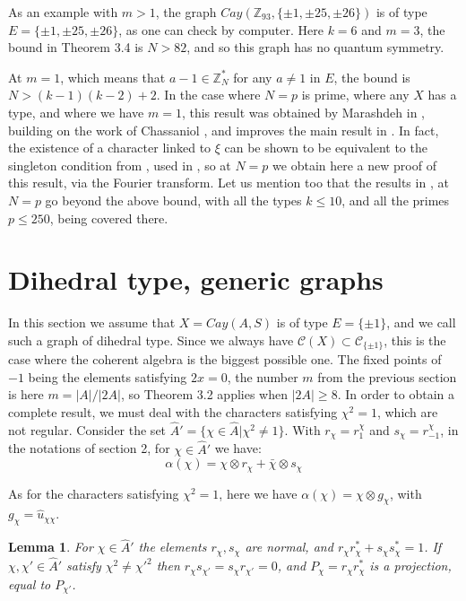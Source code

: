 \documentclass[11pt]{amsart}
\newtheorem{lemma}[theorem]{Lemma}
\newcommand{\C}{\mathcal C}
\newcommand{\Z}{\mathbb Z}
\newcommand{\hA}{\widehat A}
\newcommand{\hu}{\widehat u}
\newcommand{\bchi}{\bar\chi}
\begin{document}
As an example with $m>1$, the graph $Cay(\Z_{93},\{\pm1,\pm25,\pm26\})$ is of type $E=\{\pm1,\pm25,\pm26\}$, as one can check by computer. Here $k=6$ and $m=3$, the bound in Theorem 3.4 is $N>82$, and so this graph has no quantum symmetry.

At $m=1$, which means that $a-1\in\Z_N^*$ for any $a\neq1$ in $E$, the bound is $N>(k-1)(k-2)+2$. In the case where $N=p$ is prime, where any $X$ has a type, and where we have $m=1$, this result was obtained by Marashdeh in \cite{mar}, building on the work of Chassaniol \cite{cha}, and improves the main result in \cite{bbc}. In fact, the existence of a character linked to $\xi$ can be shown to be equivalent to the singleton condition from \cite{cha}, used in \cite{mar}, so at $N=p$ we obtain here a new proof of this result, via the Fourier transform. Let us mention too that the results in \cite{cha}, \cite{mar} at $N=p$ go beyond the above bound, with all the types $k\leq10$, and all the primes $p\leq250$, being covered there.

\section{Dihedral type, generic graphs}

In this section we assume that $X=Cay(A,S)$ is of type $E=\{\pm1\}$, and we call such a graph of dihedral type. Since we always have $\C(X)\subset\C_{\{\pm1\}}$, this is the case where the coherent algebra is the biggest possible one. The fixed points of $-1$ being the elements satisfying $2x=0$, the number $m$ from the previous section is here $m=|A|/|2A|$, so Theorem 3.2 applies when $|2A|\geq8$. In order to obtain a complete result, we must deal with the characters satisfying $\chi^2=1$, which are not regular. Consider the set $\hA'=\{\chi\in\hA|\chi^2\neq1\}$. With $r_\chi=r^\chi_1$ and $s_\chi=r^\chi_{-1}$, in the notations of section 2, for $\chi\in\hA'$ we have:
$$\alpha(\chi)=\chi\otimes r_\chi+\bchi\otimes s_\chi$$

As for the characters satisfying $\chi^2=1$, here we have $\alpha(\chi)=\chi\otimes g_\chi$, with $g_\chi=\hu_{\chi\chi}$.

\begin{lemma}
For $\chi\in\hA'$ the elements $r_\chi,s_\chi$ are normal, and $r_\chi r_\chi^*+s_\chi s_\chi^*=1$. If $\chi,\chi'\in\hA'$ satisfy $\chi^2\neq\chi'^2$ then $r_\chi s_{\chi'}=s_\chi r_{\chi'}=0$, and $P_\chi=r_\chi r_\chi^*$ is a projection, equal to $P_{\chi'}$.
\end{lemma}
\end{document}
